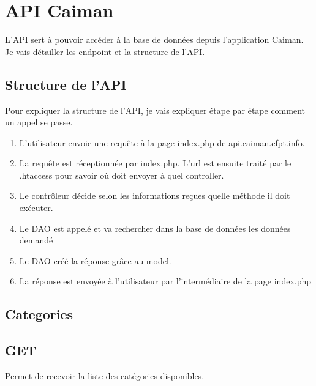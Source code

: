 \documentclass[a4paper,12pt,french]{sphinxmanual}
\begin{document}
\chapter{API Caiman}
\label{\detokenize{fonctionnelleAPI:api-caiman}}\label{\detokenize{fonctionnelleAPI::doc}}
\sphinxAtStartPar
L’API sert à pouvoir accéder à la base de données depuis l’application Caiman. Je vais détailler les endpoint et la structure de l’API.


\section{Structure de l’API}
\label{\detokenize{fonctionnelleAPI:structure-de-lapi}}
\sphinxAtStartPar
{}

\sphinxAtStartPar
Pour expliquer la structure de l’API, je vais expliquer étape par étape comment un appel se passe.
\begin{enumerate}
%
\item {} 
\sphinxAtStartPar
L’utilisateur envoie une requête à la page index.php de api.caiman.cfpt.info.

\item {} 
\sphinxAtStartPar
La requête est réceptionnée par index.php. L’url est ensuite traité par le .htaccess pour savoir où doit envoyer à quel controller.

\item {} 
\sphinxAtStartPar
Le contrôleur décide selon les informations reçues quelle méthode il doit exécuter.

\item {} 
\sphinxAtStartPar
Le DAO est appelé et va rechercher dans la base de données les données demandé

\item {} 
\sphinxAtStartPar
Le DAO créé la réponse grâce au model.

\item {} 
\sphinxAtStartPar
La réponse est envoyée à l’utilisateur par l’intermédiaire de la page index.php

\end{enumerate}


\section{Categories}
\label{\detokenize{fonctionnelleAPI:categories}}

\section{GET}
\label{\detokenize{fonctionnelleAPI:get}}
\sphinxAtStartPar
Permet de recevoir la liste des catégories disponibles.
\end{document}

